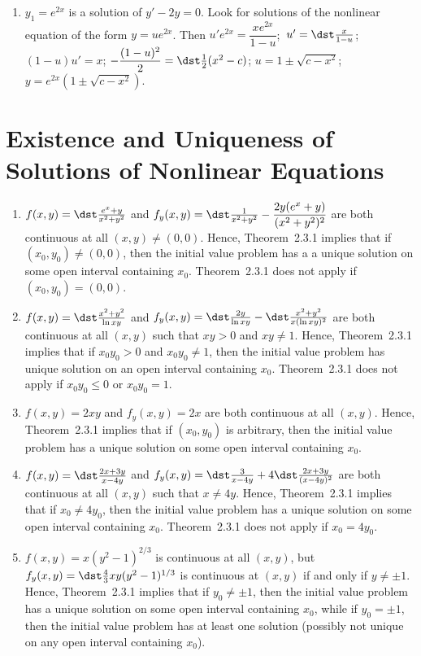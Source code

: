 \documentclass[openany]{book}
\newenvironment{sectionSolutions}{
 \begin{enumerate}[item-label={\thesection.\arabic{enumi}.}]
}{
 \end{enumerate}
}
\begin{document}
\begin{sectionSolutions}
\item
$y_1=e^{2x}$ is a solution of $y'-2y=0$.
Look for solutions of the nonlinear equation of the form $y=ue^{2x}$.
Then $u'e^{2x}=\dfrac{xe^{2x}}{1-u}$;\ $u'=\dst\frac{x}{1-u}$;\;
$(1-u)u'=x$;\;
$-\dfrac{(1-u)^2}{2}=\dst\frac{1}{2}(x^2-c)$;\;
$u=1\pm\sqrt{c-x^2}$;\;
$y=e^{2x}\left(1\pm\sqrt{c-x^2}\right)$.

\end{sectionSolutions}

\section{Existence and Uniqueness of Solutions of Nonlinear Equations}

\begin{sectionSolutions}
\item
$f(x,y)=\dst\frac{e^x+y}{ x^2+y^2}$ and $f_y(x,y)=\dst\frac{1}{
x^2+y^2}-\dfrac{2y(e^x+y)}{(x^2+y^2)^2}$ are both continuous at all
$(x,y)\ne(0,0)$. Hence,  Theorem~2.3.1 implies that if
$(x_0,y_0)\ne(0,0)$, then  the initial
value problem has a a unique solution on some open interval containing
$x_0$.  Theorem~2.3.1 does not apply
if $(x_0,y_0)=(0,0)$.

\item
$f(x,y)=\dst\frac{x^2+y^2}{\ln xy}$ and $f_y(x,y)=\dst\frac{2y}{\ln
xy}-\dst\frac{x^2+y^2}{ x(\ln xy)^2}$ are both continuous at all $(x,y)$
such that $xy>0$ and $xy\ne1$. Hence,  Theorem~2.3.1 implies
that if
$x_0y_0>0$ and $x_0y_0\ne1$, then the
initial value problem has unique solution on an open interval
containing $x_0$.   Theorem~2.3.1 does not apply
if $x_0y_0\le0$ or $x_0y_0=1$.


\item
$f(x,y)=2xy$ and $f_y(x,y)=2x$ are both continuous at all $(x,y)$.
Hence,  Theorem~2.3.1 implies that if $(x_0,y_0)$
is arbitrary, then the initial value problem
has a  unique solution on some open interval containing  $x_0$.


\item
$f(x,y)=\dst\frac{2x+3y}{ x-4y}$ and $f_y(x,y)=\dst\frac{3}{
x-4y}+4\dst\frac{2x+3y}{(x-4y)^2}$ are both continuous at all $(x,y)$
such that $x\ne4y$. Hence,  Theorem~2.3.1 implies that if
$x_0\ne4y_0$, then the
initial value problem has a  unique solution on some open interval
containing  $x_0$.
  Theorem~2.3.1 does not apply if $x_0=4y_0$.

\item
$f(x,y)=x(y^2-1)^{2/3}$ is continuous at all $(x,y)$, but
$f_y(x,y)=\dst\frac{4}{3}xy(y^2-1)^{1/3}$ is continuous at $(x,y)$ if
and only if $y\ne\pm1$. Hence,  Theorem~2.3.1 implies that
if $y_0\ne\pm1$, then the
initial value problem has a  unique solution on some open interval
containing  $x_0$, while  if $y_0=\pm1$, then the initial value problem
 has at least one solution (possibly not unique on any
open interval containing  $x_0$).



\end{sectionSolutions}
\end{document}
